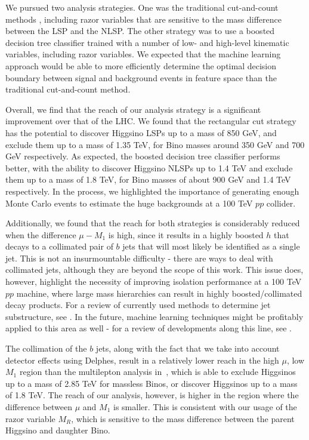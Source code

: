 \documentclass[a4paper,11pt]{article}
\begin{document}
We pursued two analysis strategies. One was the traditional cut-and-count methods , including razor variables
that are sensitive to the mass difference between the LSP and the NLSP. The
other strategy was to use a boosted decision tree classifier trained with a
number of low- and high-level kinematic variables, including razor variables. We expected
that the machine learning approach would be able to more efficiently determine
the optimal decision boundary between signal and background events in feature
space than the traditional   cut-and-count method.

Overall, we find that the reach of our analysis strategy is a significant
improvement over that of the LHC. We found that the rectangular cut strategy has
the potential to discover Higgsino LSPs up to a mass of 850 GeV, and exclude
them up to a mass of 1.35 TeV, for Bino masses around 350 GeV and 700 GeV
respectively. 
As expected, the boosted decision tree classifier
performs better, with the ability to discover Higgsino NLSPs up to 1.4 TeV and
exclude them up to a mass of 1.8 TeV, for Bino masses of about 900 GeV and 1.4
TeV respectively.   In the
process, we highlighted the importance of generating enough Monte Carlo events
to estimate the huge backgrounds at a 100 TeV $pp$ collider.   

Additionally, we found that the reach for both strategies is considerably
reduced when the difference $ \mu-M_1$ is high, since it results in a highly
boosted $h$ that decays to a collimated pair of $b$ jets that will most likely be
identified as a single jet. This is not an insurmountable difficulty - there are
ways to deal with collimated jets, although they are beyond the scope of this
work. This issue does, however, highlight the necessity of improving isolation
performance at a 100 TeV $pp$ machine, where large mass hierarchies can result in
highly boosted/collimated decay products. For a review of currently used methods
to determine jet substructure, see \cite{Shelton:2013an}. In the future,
machine learning techniques might be profitably applied to this area as well -
for a review of developments along this line, see \cite{Schwartzman:2016jqu}. 

The collimation of the $b$ jets, along with the fact that we take into account
detector effects using Delphes, result in a relatively lower reach in the high
$\mu$, low $M_1$ region than the multilepton analysis in~\cite{Gori:2014oua},
which is able to exclude Higgsinos up to a mass of 2.85 TeV for massless Binos,
or discover Higgsinos up to a mass of 1.8 TeV.   The reach of our analysis,
however,  is higher in the region where the difference between $\mu$ and $M_1$
is smaller. This is consistent with our usage of the razor variable $M_R$,
which is sensitive to the mass difference between the parent Higgsino and
daughter Bino.
\end{document}
